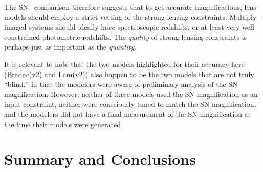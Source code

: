 
The SN \tomas\ comparison therefore suggests that to get accurate
magnifications, lens models should employ a strict vetting of the
strong-lensing constraints.  Multiply-imaged systems should ideally
have spectroscopic redshifts, or at least very well constrained
photometric redshifts.  The {\it quality} of strong-lensing
constraints is perhaps just as important as the {\it quantity}.

It is relevant to note that the two models highlighted for their
accuracy here (Bradac(v2) and Lam(v2)) also happen to be the two
models that are not truly ``blind,'' in that the modelers were aware
of preliminary analysis of the SN magnification.  However, neither of
these models used the SN magnification as an input constraint, neither
were consciously tuned to match the SN magnification, and the modelers did not
have a final measurement of the SN magnification at the time their
models were generated.


%
%
%
%
%
%


\section{Summary and Conclusions}
\label{sec:SummaryAndConclusions}

